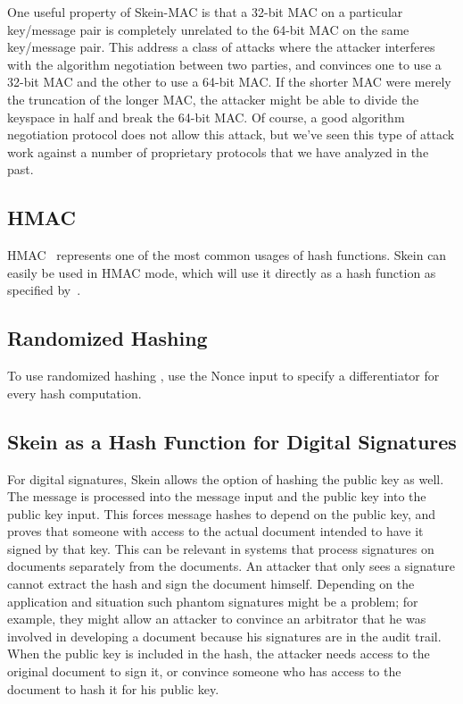 \documentclass[11pt,twoside]{article}
\begin{document}
One useful property of Skein-MAC is that a 32-bit MAC on a particular key/message pair is completely unrelated to the 64-bit MAC on the same key/message pair. This address a class of attacks where the attacker interferes with the algorithm negotiation between two parties, and convinces one to use a 32-bit MAC and the other to use a 64-bit MAC.  If the shorter MAC were merely the truncation of the longer MAC, the attacker might be able to divide the keyspace in half and break the 64-bit MAC. Of course, a good algorithm negotiation protocol does not allow this attack, but we've seen this type of attack work against a number of proprietary protocols that we have analyzed in the past.

\subsection{HMAC}

HMAC~\cite{B06,HMAC1} represents one of the most common usages of hash functions.  Skein can easily be used in HMAC mode, which will use it directly as a hash function as specified by~\cite{HMAC2}.

\subsection{Randomized Hashing}

To use randomized hashing \cite{HK06,D08}, use the Nonce input to specify a differentiator for every hash computation.

\subsection{Skein as a Hash Function for Digital Signatures}

For digital signatures, Skein allows the option of hashing the public key as well.  The message is processed into the message input and the public key into the public key input.  This forces message hashes to depend on the public key, and proves that someone with access to the actual document intended to have it signed by that key. This can be relevant in systems that process signatures on documents separately from the documents. An attacker that only sees a signature cannot extract the hash and sign the document himself. Depending on the application and situation such phantom signatures might be a problem; for example, they might allow an attacker to convince an arbitrator that he was involved in developing a document because his signatures are in the audit trail. When the public key is included in the hash, the attacker needs access to the original document to sign it, or convince someone who has access to the document to hash it for his public key.
\end{document}
